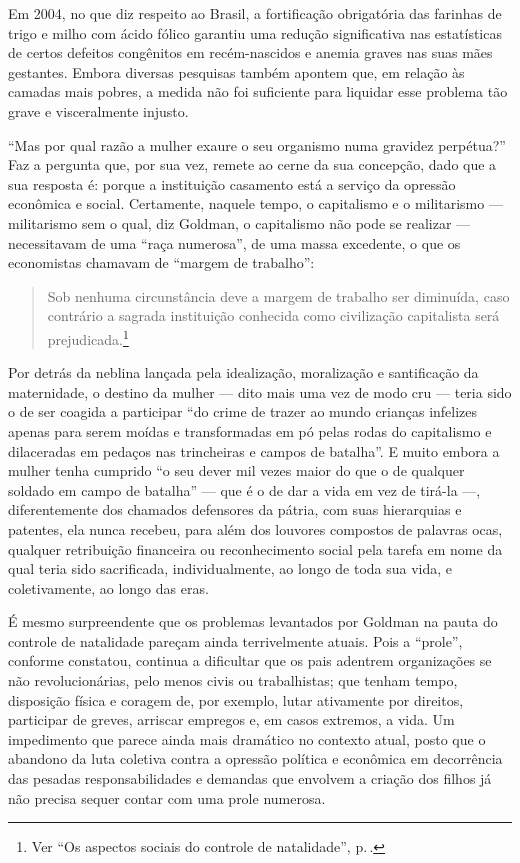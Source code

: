 Em 2004, no que diz respeito ao
Brasil, a fortificação obrigatória
das farinhas de trigo e milho com ácido fólico garantiu uma redução
significativa nas estatísticas de certos defeitos congênitos em
recém-nascidos e anemia graves nas suas mães gestantes. Embora
diversas pesquisas também apontem que, em relação às camadas
mais pobres, a medida não foi suficiente para liquidar esse problema tão
grave e visceralmente injusto.

``Mas por qual razão a mulher exaure o seu organismo numa gravidez
perpétua?'' Faz a pergunta que, por sua vez, remete ao cerne da sua
concepção, dado que a sua resposta é: porque a instituição casamento
está a serviço da opressão econômica e social. Certamente, naquele
tempo, o capitalismo e o militarismo --- militarismo sem o qual, diz
Goldman, o capitalismo não pode se realizar --- necessitavam de uma
``raça numerosa'', de uma massa excedente, o que os economistas chamavam
de ``margem de trabalho'':

\begin{quote}
Sob nenhuma circunstância deve a margem de trabalho
ser diminuída, caso contrário a sagrada instituição conhecida como
civilização capitalista será prejudicada.\footnote{Ver ``Os aspectos sociais do controle de natalidade'', p.\,\pageref{margem}.}
\end{quote}

Por detrás da neblina
lançada pela idealização, moralização e santificação da maternidade, o
destino da mulher --- dito mais uma vez de modo cru --- teria sido o de
ser coagida a participar ``do crime de trazer ao mundo crianças
infelizes apenas para serem moídas e transformadas em pó pelas rodas do
capitalismo e dilaceradas em pedaços nas trincheiras e campos de
batalha''. E muito embora a mulher tenha cumprido ``o seu dever mil vezes maior do
que o de qualquer soldado em campo de batalha'' --- que é o de dar
a vida em vez de tirá-la ---, diferentemente dos chamados defensores da
pátria, com suas hierarquias e patentes, ela nunca recebeu, para além
dos louvores compostos de palavras ocas, qualquer retribuição financeira
ou reconhecimento social pela tarefa em nome da qual teria sido
sacrificada, individualmente, ao longo de toda sua vida, e
coletivamente, ao longo das eras.

É mesmo surpreendente que os problemas levantados por Goldman na pauta
do controle de natalidade pareçam ainda terrivelmente atuais. Pois a
``prole'', conforme constatou, continua a dificultar que os pais
adentrem organizações se não revolucionárias, pelo menos civis ou
trabalhistas; que tenham tempo, disposição física e coragem de, por
exemplo, lutar ativamente por direitos, participar de greves, arriscar
empregos e, em casos extremos, a vida. Um impedimento que parece ainda
mais dramático no contexto atual, posto que o abandono da luta coletiva
contra a opressão política e econômica em decorrência das pesadas
responsabilidades e demandas que envolvem a criação dos filhos já não
precisa sequer contar com uma prole numerosa.


